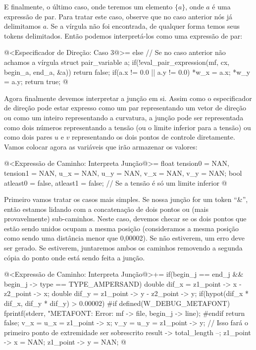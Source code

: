 {E finalmente, o último caso, onde teremos um elemento $\{a\}$, onde
$a$ é uma expressão de par. Para tratar este caso, observe que no caso
anterior nós já delimitamos $a$. Se a vírgula não foi encontrada, de
qualquer forma temos seus tokens delimitados. Então podemos
interpretá-los como uma expressão de par:

\iniciocodigo
@<Especificador de Direção: Caso 3@>=
else{ // Se no caso anterior não achamos a vírgula
  struct pair_variable a;
  if(!eval_pair_expression(mf, cx, begin_a, end_a, &a))
    return false;
  if(a.x != 0.0 || a.y != 0.0){
    *w_x = a.x;
    *w_y = a.y;
  }
  return true;
}
@
\fimcodigo

Agora finalmente devemos interpretar a junção em si. Assim como o
especificador de direção pode estar expresso como um par representando
um vetor de direção ou como um inteiro representando a curvatura, a
junção pode ser representada como dois números representando a tensão
(ou o limite inferior para a tensão) ou como dois pares $u$ e $v$
representando os dois pontos de controle diretamente. Vamos colocar
agora as variáveis que irão armazenar os valores:

\iniciocodigo
@<Expressão de Caminho: Interpreta Junção@>=
float tension0 = NAN, tension1 = NAN, u_x = NAN, u_y = NAN, v_x = NAN,
      v_y = NAN;
bool atleast0 = false, atleast1 = false; // Se a tensão é só um limite inferior
@
\fimcodigo

Primeiro vamos tratar os casos mais simples. Se nossa junção for um
token ``\&'', então estamos lidando com a concatenação de dois pontos
ou (mais provavelmente) sub-caminhos. Neste caso, devemos checar se os
dois pontos que estão sendo unidos ocupam a mesma posição
(consideramos a mesma posição como sendo uma distância menor que
0,00002). Se não estiverem, um erro deve ser gerado. Se estiverem,
juntaremos ambos os caminhos removendo a segunda cópia do ponto onde
está sendo feita a junção.

\iniciocodigo
@<Expressão de Caminho: Interpreta Junção@>+=
if(begin_j == end_j && begin_j -> type == TYPE_AMPERSAND){
  double dif_x = z1_point -> x - z2_point -> x;
  double dif_y = z1_point -> y - z2_point -> y;
  if(hypot(dif_x * dif_x, dif_y * dif_y) > 0.00002){
#if defined(W_DEBUG_METAFONT)
    fprintf(stderr,
            "METAFONT: Error: %
            mf -> file, begin_j -> line);
#endif
    return false;
  }
  v_x = u_x = z1_point -> x;
  v_y = u_y = z1_point -> y;
  // Isso fará o primeiro ponto de extremidade ser sobrescrito
  result -> total_length --;
  z1_point -> x = NAN;
  z1_point -> y = NAN;
}
@
\fimcodigo

}
